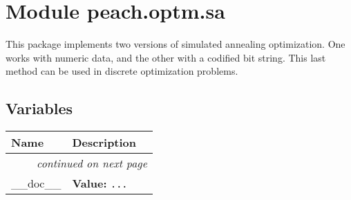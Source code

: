 %
%
%


\section{Module peach.optm.sa}

    \label{peach:optm:sa}

This package implements two versions of simulated annealing optimization. One
works with numeric data, and the other with a codified bit string. This last
method can be used in discrete optimization problems.


  \subsection{Variables}

\begin{longtable}{|p{}|p{}|l}
\cline{1-2}
\cline{1-2} \centering \textbf{Name} & \centering \textbf{Description}& \\
\cline{1-2}
\endhead\cline{1-2}\multicolumn{3}{r}{\small\textit{continued on next page}}\\\endfoot\cline{1-2}
\endlastfoot\raggedright \_\-\_\-d\-o\-c\-\_\-\_\- & \raggedright \textbf{Value:} 
{\tt \texttt{...}}&\\
\cline{1-2}
\end{longtable}



